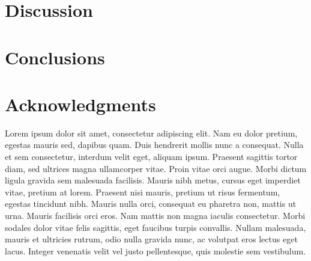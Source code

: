 \section{Discussion}

\section{Conclusions}

\section{Acknowledgments}

Lorem ipsum dolor sit amet, consectetur adipiscing elit. Nam eu dolor pretium,
egestas mauris sed, dapibus quam. Duis hendrerit mollis nunc a consequat. Nulla
et sem consectetur, interdum velit eget, aliquam ipsum. Praesent sagittis
tortor diam, sed ultrices magna ullamcorper vitae. Proin vitae orci augue.
Morbi dictum ligula gravida sem malesuada facilisis. Mauris nibh metus, cursus
eget imperdiet vitae, pretium at lorem. Praesent nisi mauris, pretium ut risus
fermentum, egestas tincidunt nibh. Mauris nulla orci, consequat eu pharetra
non, mattis ut urna. Mauris facilisis orci eros. Nam mattis non magna iaculis
consectetur. Morbi sodales dolor vitae felis sagittis, eget faucibus turpis
convallis. Nullam malesuada, mauris et ultricies rutrum, odio nulla gravida
nunc, ac volutpat eros lectus eget lacus. Integer venenatis velit vel justo
pellentesque, quis molestie sem vestibulum.
